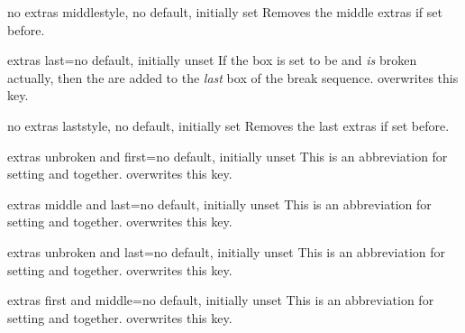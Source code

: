 \begin{docTcbKey}[][doc new=2015-07-16]{no extras middle}{}{style, no default, initially set}
  Removes the middle extras if set before.
\end{docTcbKey}

\begin{docTcbKey}[][doc new=2015-07-16]{extras last}{=}{no default, initially unset}
  If the box is set to be  and \emph{is} broken actually,
  then the  are added to the \emph{last} box of the break sequence.
   overwrites this key.
\end{docTcbKey}

\begin{docTcbKey}[][doc new=2015-07-16]{no extras last}{}{style, no default, initially set}
  Removes the last extras if set before.
\end{docTcbKey}

\begin{docTcbKey}[][doc new=2015-07-16]{extras unbroken and first}{=}{no default, initially unset}
  This is an abbreviation for setting
   and
   together.
   overwrites this key.
\end{docTcbKey}

\begin{docTcbKey}[][doc new=2015-07-16]{extras middle and last}{=}{no default, initially unset}
  This is an abbreviation for setting
   and
   together.
   overwrites this key.
\end{docTcbKey}

\begin{docTcbKey}[][doc new=2015-07-16]{extras unbroken and last}{=}{no default, initially unset}
  This is an abbreviation for setting
   and
   together.
   overwrites this key.
\end{docTcbKey}

\clearpage

\begin{docTcbKey}[][doc new=2015-07-16]{extras first and middle}{=}{no default, initially unset}
  This is an abbreviation for setting
   and
   together.
   overwrites this key.
\end{docTcbKey}


